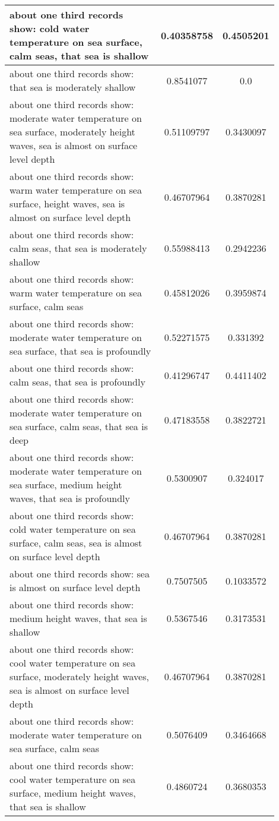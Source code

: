 \documentclass{article}
\begin{document}
\begin{longtable}{|p{0.9\linewidth}|c|c|}
about one third records show: cold water temperature on sea surface, calm seas, that sea is shallow & 0.40358758 & 0.4505201 \\ \hline
about one third records show: that sea is moderately shallow & 0.8541077 & 0.0 \\ \hline
about one third records show: moderate water temperature on sea surface, moderately height waves, sea is almost on surface level depth & 0.51109797 & 0.3430097 \\ \hline
about one third records show: warm water temperature on sea surface, height waves, sea is almost on surface level depth & 0.46707964 & 0.3870281 \\ \hline
about one third records show: calm seas, that sea is moderately shallow & 0.55988413 & 0.2942236 \\ \hline
about one third records show: warm water temperature on sea surface, calm seas & 0.45812026 & 0.3959874 \\ \hline
about one third records show: moderate water temperature on sea surface, that sea is profoundly & 0.52271575 & 0.331392 \\ \hline
about one third records show: calm seas, that sea is profoundly & 0.41296747 & 0.4411402 \\ \hline
about one third records show: moderate water temperature on sea surface, calm seas, that sea is deep & 0.47183558 & 0.3822721 \\ \hline
about one third records show: moderate water temperature on sea surface, medium height waves, that sea is profoundly & 0.5300907 & 0.324017 \\ \hline
about one third records show: cold water temperature on sea surface, calm seas, sea is almost on surface level depth & 0.46707964 & 0.3870281 \\ \hline
about one third records show: sea is almost on surface level depth & 0.7507505 & 0.1033572 \\ \hline
about one third records show: medium height waves, that sea is shallow & 0.5367546 & 0.3173531 \\ \hline
about one third records show: cool water temperature on sea surface, moderately height waves, sea is almost on surface level depth & 0.46707964 & 0.3870281 \\ \hline
about one third records show: moderate water temperature on sea surface, calm seas & 0.5076409 & 0.3464668 \\ \hline
about one third records show: cool water temperature on sea surface, medium height waves, that sea is shallow & 0.4860724 & 0.3680353 \\ \hline

\end{longtable}
\end{document}
